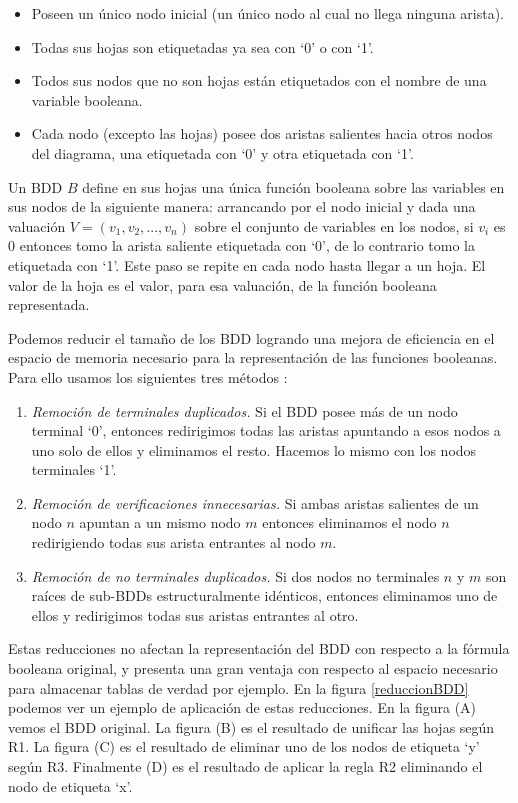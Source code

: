 \documentclass[pdftex,a4paper,12pt]{book}
\begin{document}
\begin{itemize}
\item Poseen un \'unico nodo inicial (un \'unico nodo al cual no llega ninguna arista).
\item Todas sus hojas son etiquetadas ya sea con `0' o con `1'.
\item Todos sus nodos que no son hojas est\'an etiquetados con el nombre de una variable booleana.
\item Cada nodo (excepto las hojas) posee dos aristas salientes hacia otros nodos del diagrama, una etiquetada con `0' y otra etiquetada con `1'.
\end{itemize}

Un BDD $B$ define en sus hojas una \'unica funci\'on booleana sobre las variables en sus nodos de la siguiente manera: arrancando por el nodo inicial y dada una valuaci\'on $V=(v_1,v_2,...,v_n)$ sobre el conjunto de variables en los nodos, si $v_i$ es $0$ entonces tomo la arista saliente etiquetada con `0', de lo contrario tomo la etiquetada con `1'. Este paso se repite en cada nodo hasta llegar a un hoja. El valor de la hoja es el valor, para esa valuaci\'on, de la funci\'on booleana representada.

Podemos reducir el tama\~no de los BDD logrando una mejora de eficiencia en el espacio de memoria necesario para la representaci\'on de las funciones booleanas. Para ello usamos los siguientes tres m\'etodos \cite{Huth}:

\begin{enumerate}[R1--]
\item \textit{Remoci\'on de terminales duplicados.} Si el BDD posee m\'as de un nodo terminal `0', entonces redirigimos todas las aristas apuntando a esos nodos a uno solo de ellos y eliminamos el resto. Hacemos lo mismo con los nodos terminales `1'.
\item \textit{Remoci\'on de verificaciones innecesarias.} Si ambas aristas salientes de un nodo $n$ apuntan a un mismo nodo $m$ entonces eliminamos el nodo $n$ redirigiendo todas sus arista entrantes al nodo $m$.
\item \textit{Remoci\'on de no terminales duplicados.} Si dos nodos no terminales $n$ y $m$ son ra\'ices de sub-BDDs estructuralmente id\'enticos, entonces eliminamos uno de ellos y redirigimos todas sus aristas entrantes al otro.
\end{enumerate}

Estas reducciones no afectan la representaci\'on del BDD con respecto a la f\'ormula booleana original, y presenta una gran ventaja con respecto al espacio necesario para almacenar tablas de verdad por ejemplo. En la figura \ref{reduccionBDD} podemos ver un ejemplo de aplicaci\'on de estas reducciones. En la figura (A) vemos el BDD original. La figura (B) es el resultado de unificar las hojas seg\'un R1. La figura (C) es el resultado de eliminar uno de los nodos de etiqueta `y' seg\'un R3. Finalmente (D) es el resultado de aplicar la regla R2 eliminando el nodo de etiqueta `x'.
\end{document}
